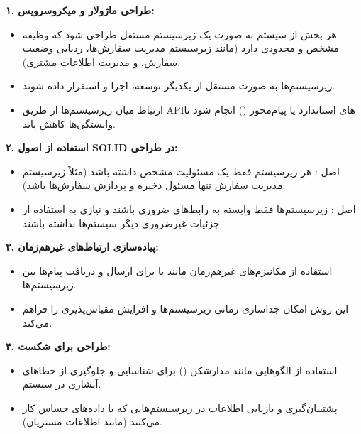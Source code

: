 \pagebreak



\begin{flushright}

	\textbf{۱. طراحی ماژولار و میکروسرویس:}
	\begin{itemize}
		\item هر بخش از سیستم به صورت یک زیرسیستم مستقل طراحی شود که وظیفه مشخص و محدودی دارد (مانند زیرسیستم مدیریت سفارش‌ها، ردیابی وضعیت سفارش، و مدیریت اطلاعات مشتری).
		\item زیرسیستم‌ها به صورت مستقل از یکدیگر توسعه، اجرا و استقرار داده شوند.
		\item ارتباط میان زیرسیستم‌ها از طریق APIهای استاندارد یا پیام‌محور () انجام شود تا وابستگی‌ها کاهش یابد.
	\end{itemize}
	
	\textbf{۲. استفاده از اصول SOLID در طراحی:}
	\begin{itemize}
		\item اصل : هر زیرسیستم فقط یک مسئولیت مشخص داشته باشد (مثلاً زیرسیستم مدیریت سفارش تنها مسئول ذخیره و پردازش سفارش‌ها باشد).
		\item اصل : زیرسیستم‌ها فقط وابسته به رابط‌های ضروری باشند و نیازی به استفاده از جزئیات غیرضروری دیگر سیستم‌ها نداشته باشند.
	\end{itemize}
	
	\textbf{۳. پیاده‌سازی ارتباط‌های غیرهم‌زمان:}
	\begin{itemize}
		\item استفاده از مکانیزم‌های غیرهم‌زمان مانند  یا  برای ارسال و دریافت پیام‌ها بین زیرسیستم‌ها.
		\item این روش امکان جداسازی زمانی زیرسیستم‌ها و افزایش مقیاس‌پذیری را فراهم می‌کند.
	\end{itemize}
	
	\textbf{۴. طراحی برای شکست:}
	\begin{itemize}
		\item استفاده از الگوهایی مانند مدارشکن () برای شناسایی و جلوگیری از خطاهای آبشاری در سیستم.
		\item پشتیبان‌گیری و بازیابی اطلاعات در زیرسیستم‌هایی که با داده‌های حساس کار می‌کنند (مانند اطلاعات مشتریان).
	\end{itemize}
	

\end{flushright}
